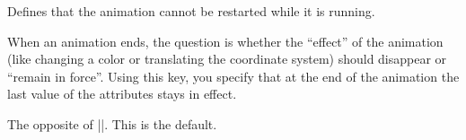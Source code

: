\begin{command}{\pgfsysanimkeyrestartwhennotactive}
\end{command}
\begin{command}{\pgfsys@animation@restart@whennotactive}
    Defines that the animation cannot be restarted while it is running.
\begin{codeexample}[imagesource={standalone/pgfmanual-en-pgfsys-animations-animation-39.svg}]
\end{codeexample}
\end{command}

\begin{command}{\pgfsysanimkeyfreezeatend}
\end{command}
\begin{command}{\pgfsys@animation@freezeatend}
    When an animation ends, the question is whether the ``effect'' of the
    animation (like changing a color or translating the coordinate system)
    should disappear or ``remain in force''. Using this key, you specify that
    at the end of the animation the last value of the attributes stays in
    effect.
\begin{codeexample}[imagesource={standalone/pgfmanual-en-pgfsys-animations-animation-40.svg}]
\end{codeexample}
\end{command}

\begin{command}{\pgfsysanimkeyremoveatend}
\end{command}
\begin{command}{\pgfsys@animation@removeatend{}}
    The opposite of |\pgfsysanimkeyfreezeatend|. This is the default.
\begin{codeexample}[imagesource={standalone/pgfmanual-en-pgfsys-animations-animation-41.svg}]
\end{codeexample}
\end{command}


